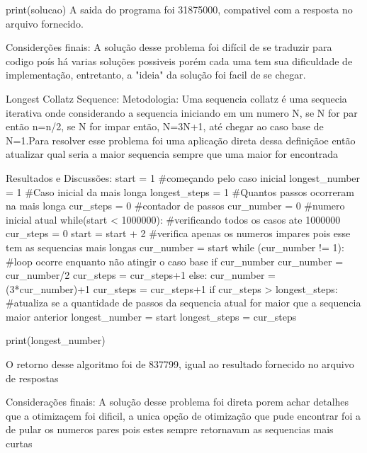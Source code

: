             print(solucao)
            A saida do programa foi 31875000, compativel com a resposta no arquivo fornecido.

        Considerções finais:
            A solução desse problema foi difícil de se traduzir para codigo poís há varias soluções possiveis porém cada uma tem sua dificuldade de implementação, entretanto, a "ideia" da solução foi facil de se chegar.

    Longest Collatz Sequence:
        Metodologia:
            Uma sequencia collatz é uma sequecia iterativa onde considerando a sequencia iniciando em um numero N, se N for par então n=n/2, se N for impar então, N=3N+1, até chegar ao caso base de N=1.Para resolver esse problema foi uma aplicação direta dessa definiçãoe então atualizar qual seria a maior sequencia sempre que uma maior for encontrada

        Resultados e Discussões:
            start = 1 #começando pelo caso inicial
            longest_number = 1 #Caso inicial da mais longa
            longest_steps = 1 #Quantos passos ocorreram na mais longa
            cur_steps = 0 #contador de passos
            cur_number = 0 #numero inicial atual
            while(start < 1000000): #verificando todos os casos ate 1000000
                cur_steps = 0
                start = start + 2 #verifica apenas os numeros impares pois esse tem as sequencias mais longas
                cur_number = start
                while (cur_number != 1): #loop ocorre enquanto não atingir o caso base
                    if cur_number%
                        cur_number = cur_number/2
                        cur_steps = cur_steps+1
                    else:
                        cur_number = (3*cur_number)+1			
                        cur_steps = cur_steps+1
                if cur_steps > longest_steps: #atualiza se a quantidade de passos da sequencia atual for maior que a sequencia maior anterior
                    longest_number = start
                    longest_steps = cur_steps
                    
            print(longest_number)

            O retorno desse algoritmo foi de 837799, igual ao resultado fornecido no arquivo de respostas

        Considerações finais:
            A solução desse problema foi direta porem achar detalhes que a otimizaçem foi dificil, a unica opção de otimização que pude encontrar foi a de pular os numeros pares pois estes sempre retornavam as sequencias mais curtas


